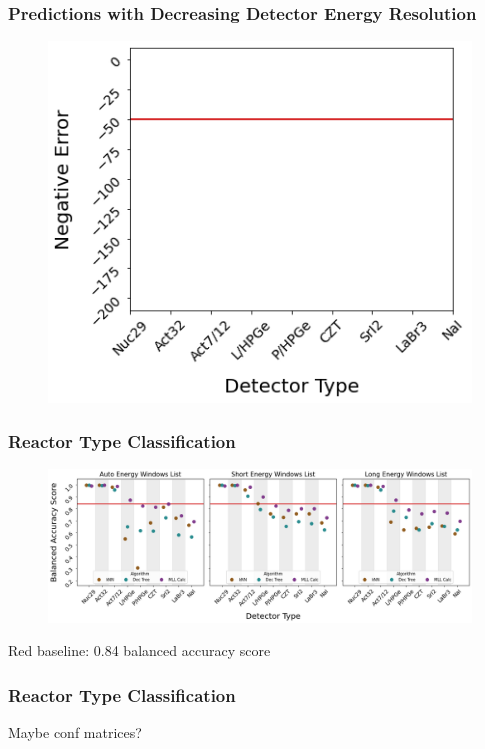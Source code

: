 \begin{frame}
  \frametitle{Predictions with Decreasing Detector Energy Resolution}
  \begin{figure}
    \centering
    \includegraphics[height=0.7\textheight]{./figures/plot_description.png}
  \end{figure}
\end{frame}

\begin{frame}
  \frametitle{Reactor Type Classification}
  \begin{adjustwidth}{-15pt}{-10pt}
  \begin{figure}
    \centering
    \includegraphics[width=1.1\textwidth]{./figures/detector_preds_wrt_enlist_BalAcc_rxtr.png}
  \end{figure}
  \vspace{12pt} \centering Red baseline: 0.84 balanced accuracy score
  \end{adjustwidth}
\end{frame}

\begin{frame}
  \frametitle{Reactor Type Classification}
  Maybe conf matrices?
\end{frame}


